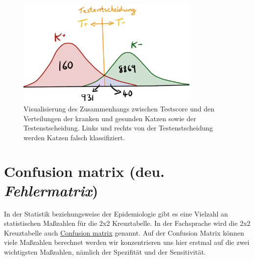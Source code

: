 \documentclass[
  letterpaper,
]{scrbook}
\begin{document}
\begin{figure}

{\centering \includegraphics[width=0.8\textwidth,height=\textheight]{./images/diag_testen_dist.png}

}

\caption{\label{fig-stat-diag-00}Visualisierung des Zusammenhangs
zwischen Testscore und den Verteilungen der kranken und gesunden Katzen
sowie der Testenstscheidung. Links und rechts von der Testenstscheidung
werden Katzen falsch klassifiziert.}

\end{figure}

\hypertarget{confusion-matrix-deu.-fehlermatrix}{%
\section{\texorpdfstring{Confusion matrix (deu.
\emph{Fehlermatrix})}{Confusion matrix (deu. Fehlermatrix)}}\label{confusion-matrix-deu.-fehlermatrix}}


In der Statistik beziehungsweise der Epidemiologie gibt es eine Vielzahl
an statistischen Maßzahlen für die 2x2 Kreuztabelle. In der Fachsprache
wird die 2x2 Kreuztabelle auch
\href{https://en.wikipedia.org/wiki/Confusion_matrix}{Confusion matrix}
genannt. Auf der Confusion Matrix können viele Maßzahlen berechnet
werden wir konzentrieren uns hier erstmal auf die zwei wichtigsten
Maßzahlen, nämlich der Spezifität und der Sensitivität.
\end{document}
